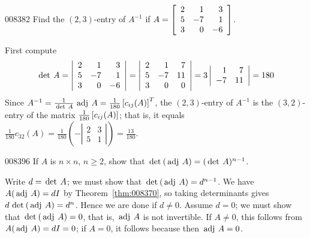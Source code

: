\begin{example}{}{008382}
Find the $(2, 3)$-entry of $A^{-1}$ if  $A = \left[ \begin{array}{rrr}
2 & 1 & 3 \\
5 & -7 & 1 \\
3 & 0 & -6 
\end{array}\right]$.

\begin{solution}
  First compute 
\begin{equation*}
\thinspace\operatorname{det \medspace} A = \left| \begin{array}{rrr}
2 & 1 & 3 \\
5 & -7 & 1 \\
3 & 0 & -6 
\end{array} \right| = \left| \begin{array}{rrr}
2 & 1 & 7 \\
5 & -7 & 11 \\
3 & 0 & 0
\end{array} \right| = 
3 \left| \begin{array}{rr}
1 & 7 \\
-7 & 11 
\end{array}\right| = 180
\end{equation*}
Since $A^{-1} = \tfrac{1}{\thinspace\operatorname{det \medspace} A}\thinspace\operatorname{adj \medspace} A = \tfrac{1}{180} \left[ c_{ij}(A)\right] ^T$,
 the $(2, 3)$-entry of $A^{-1}$ is the $(3, 2)$-entry of the matrix $\tfrac{1}{180}\left[ c_{ij}(A) \right]$; that is, it equals 
$\frac{1}{180} c_{32} (A) = \frac{1}{180} \left( - \left| \begin{array}{rr}
2 & 3 \\
5 & 1 
\end{array}\right| \right) = \frac{13}{180}.$
\end{solution}
\end{example}


\begin{example}{}{008396}
If $A$ is $n \times n$, $n \geq 2$, show that $\thinspace\operatorname{det\medspace}(\thinspace\operatorname{adj \medspace}A) = (\thinspace\operatorname{det \medspace}A)^{n-1}$.


\begin{solution}
  Write $d = \thinspace\operatorname{det \medspace} A$; we must show that $\thinspace\operatorname{det\medspace}(\thinspace\operatorname{adj \medspace}A) = d^{n-1}$. We have $A(\thinspace\operatorname{adj \medspace}A) = dI$ by Theorem~\ref{thm:008370}, so taking determinants gives $d\thinspace\operatorname{det\medspace}(\thinspace\operatorname{adj \medspace}A) = d^{n}$. Hence we are done if $d \neq 0$. Assume $d = 0$; we must show that $\thinspace\operatorname{det\medspace}(\thinspace\operatorname{adj \medspace}A) = 0$, that is, $\thinspace\operatorname{adj \medspace}A$ is not invertible. If $A \neq 0$, this follows from $A(\thinspace\operatorname{adj \medspace}A) = dI = 0$; if $A = 0$, it follows because then $\thinspace\operatorname{adj \medspace}A = 0$.
\end{solution}
\end{example}

